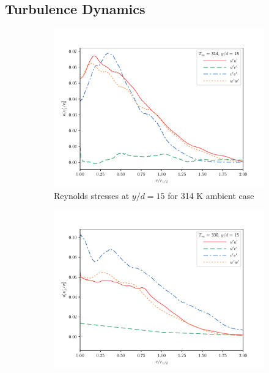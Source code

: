 \subsection{Turbulence Dynamics}

\begin{figure}[H]
\begin{center}
\begin{subfigure}{0.45\textwidth}
	\includegraphics[scale=.45]{figures/Plots/radial/slices_5/314_ambient/Rey_Stress_0_15.pdf}
	\caption{Reynolds stresses at $y/d=15$ for 314 K ambient case} \label{314_rey_15}
\end{subfigure}
\begin{subfigure}{0.45\textwidth}
	\includegraphics[scale=.45]{figures/Plots/radial/slices_5/same_ambient/Rey_Stress_0_15.pdf}

\end{subfigure}
\end{center}
\end{figure}

